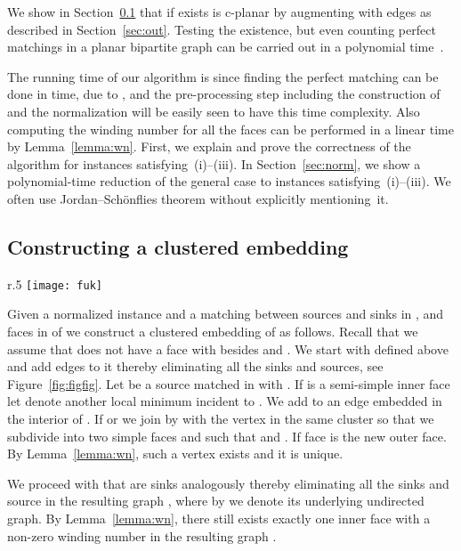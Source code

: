 \documentclass{llncs}
\newif\iflong
\begin{document}
 
We show in Section~\ref{sec:const}  that if  exists   is c-planar by augmenting 
 with edges as described in Section~\ref{sec:out}.
Testing the existence, but even counting perfect matchings in a planar bipartite graph can be carried out in a polynomial time~\cite[Section 8]{L09}.



The running time of our algorithm is  since finding the perfect matching 
can be done in   time, due to , and the pre-processing step including the construction of  and the normalization will be easily seen to have this time complexity. Also computing the winding number for all the faces can be performed in a linear time by Lemma~\ref{lemma:wn}.
First, we explain and prove the correctness of the algorithm for
 instances satisfying~(i)--(iii). In Section~\ref{sec:norm},
 we show a polynomial-time reduction of the general case  to instances  satisfying~(i)--(iii). We often use Jordan--Sch\"onflies theorem without
 explicitly mentioning~it.


\iflong\else
\fi
\subsection{Constructing a clustered embedding}
 \label{sec:const}
 
\begin{wrapfigure}{r}{.5\textwidth}
\centering
\texttt{[image: fuk]}
\caption{Subdividing a semi-simple face   (left). Subdividing a simple face  (right).}

\label{fig:figfig}
\end{wrapfigure}

 
 Given a normalized instance  and a matching  between sources and sinks in , and  faces in  of  we construct a  clustered embedding of  as follows. Recall that we assume that  does not have a face 
  with  besides  and .
  We start with  defined
above and add edges to it thereby eliminating all the sinks and sources, see Figure~\ref{fig:figfig}.
Let  be a source matched in  with . If  is a semi-simple inner face
let  denote another local minimum  incident to . We add to  
  an edge  embedded in the interior of . 
  If  or  we join  by  with the vertex in the same cluster 
so that we subdivide  into two simple faces  and  such that
 and . If   face  is the new outer face. By Lemma~\ref{lemma:wn}, such a vertex  exists and it is unique.




We proceed with  that are sinks analogously thereby eliminating all the sinks and source in the resulting graph , where by  we denote its underlying undirected graph.
By Lemma~\ref{lemma:wn}, there still exists exactly one inner face  with a non-zero winding number in the resulting graph .
\end{document}
